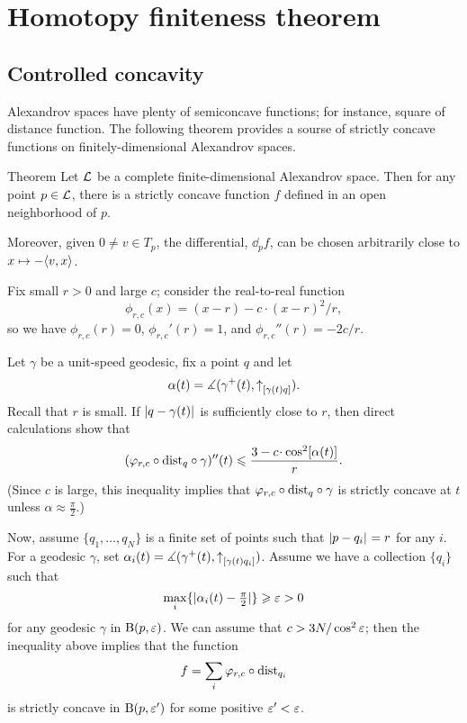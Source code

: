\chapter{Homotopy finiteness theorem}\label{chap:stability}

\section{Controlled concavity}

Alexandrov spaces have plenty of semiconcave functions;
for instance, square of distance function. 
The following theorem provides a sourse of strictly concave functions on finitely-dimensional Alexandrov spaces. 

\begin{thm}{Theorem}
\label{thm:strictly-concave}
Let $\mathcal{L}$ be a complete finite-dimensional Alexandrov  space.
Then for any point $p\in \mathcal{L}$, there is  a strictly concave function $f$ defined in an
open neighborhood of $p$.

Moreover, given $0\ne v\in T_p$, the differential, $\dd_p f$, can be chosen
arbitrarily close to $x\mapsto -\langle v,x\rangle$.
\end{thm}

Fix small $r>0$ and large $c$;
consider the real-to-real function 
$$\phi_{r,c}(x)=(x-r)- c\cdot(x-r)^2/r,$$
so we have 
$\phi_{r,c}(r)=0$,
$\phi_{r,c}'(r)=1$,
and $\phi_{r,c}''(r)=- {2c}/{r}$. 

Let $\gamma$ be a unit-speed geodesic, fix a point $q$ and let 
$$\alpha(t)=\measuredangle(\gamma^+(t),{\uparrow}_{[{\gamma(t)}{q}]}).$$
Recall that $r$ is small.
If $\dist q{\gamma(t)}{}$ is sufficiently close to
$r$, then direct calculations show that
$$(\phi_{r,c}\circ\distfun_q\circ\gamma)''(t)
\le 
\frac{3-c\cdot \cos^2[\alpha(t)]}{r}.$$
(Since $c$ is large, this inequality implies that $\varphi_{r,c}\circ\mathrm{dist}_q\circ\gamma$ is strictly concave at $t$ unless $\alpha\approx\tfrac\pi2$.) 

Now, assume $\{q_1,\dots, q_N\}$ is a finite set of points such that $\dist p{q_i}{}=r$ for any $i$. 
For a geodesic $\gamma$, set $\alpha_i(t)=\measuredangle(\gamma^+(t),{\uparrow}_{[{\gamma(t)}{q_i}]})$. 
Assume we have a collection $\{q_i\}$ such
that 
\[\max_i\{|\alpha_i(t)-\tfrac\pi2|\}\geqslant\varepsilon>0\]
for any geodesic $\gamma$ in $\mathrm{B}{}(p,\varepsilon)$. 
We can assume that $c>3N/\cos^2\varepsilon$;
then the inequality above implies that the function
$$f=\sum_i \varphi_{r,c}\circ\mathrm{dist}_{q_i}$$
is strictly concave in $\mathrm{B}{}(p,\varepsilon')$ for some positive $\varepsilon'<\varepsilon$.


